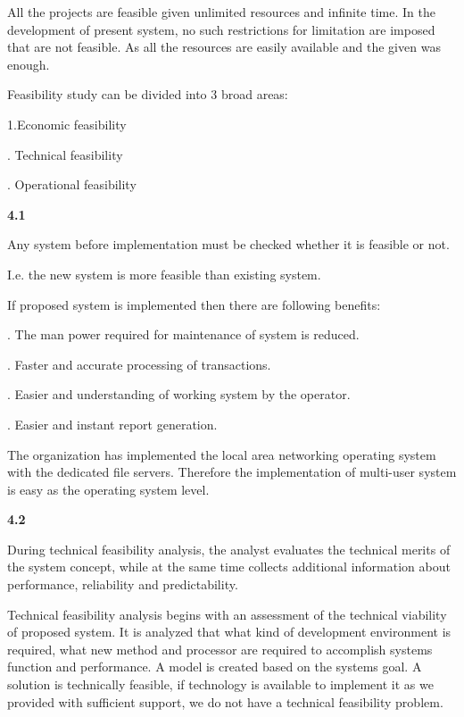 \documentclass{article} %
\begin{document}
\noindent                 All the projects are feasible given unlimited resources and infinite time. In the development of present system, no such restrictions for limitation are imposed that are not feasible. As all the resources are easily available and the given was enough. 

\noindent 

\noindent     Feasibility study can be divided into 3 broad areas:

\noindent 

\noindent 1.Economic feasibility 

. Technical feasibility 

. Operational feasibility 

\noindent 

\noindent \textbf{4.1 }\underbar{}

\noindent Any system before implementation must be checked whether it is feasible or not. 

\noindent        I.e. the new system is more feasible than existing system. 

\noindent 

\noindent If proposed system is implemented then there are following benefits: 

\noindent 

. The man power required for maintenance of system is reduced. 

. Faster and accurate processing of transactions. 

. Easier and understanding of working system by the operator. 

. Easier and instant report generation. 

\noindent 

\noindent         The organization has implemented the local area networking operating system with the dedicated file servers. Therefore the implementation of multi-user system is easy as the operating system level.

\noindent 

\noindent \textbf{4.2  }

\noindent              During technical feasibility analysis, the analyst evaluates the technical merits of the system concept, while at the same time collects additional information about performance, reliability and predictability. 

\noindent Technical feasibility analysis begins with an assessment of the technical viability of proposed system. It is analyzed that what kind of development environment is required, what new method and processor are required to accomplish systems function and performance. A model is created based on the systems goal. A solution is technically feasible, if technology is available to implement it as we provided with sufficient support, we do not have a technical feasibility problem.
\end{document}

